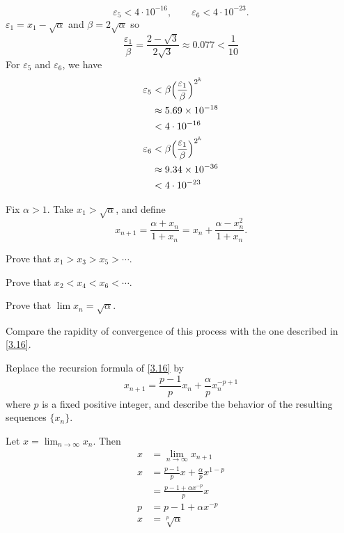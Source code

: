 \begin{exercise}
\begin{exercise}[label = (\alph*)]
    \[
    \varepsilon_5 < 4\cdot 10^{-16},\qquad\varepsilon_6 < 4\cdot 10^{-23}.
    \]
    \(\varepsilon_1 = x_1 - \sqrt{\alpha}\) and \(\beta = 2\sqrt{\alpha}\) so
    \[
    \frac{\varepsilon_1}{\beta} = \frac{2 - \sqrt{3}}{2\sqrt{3}}\approx 0.077 <
    \frac{1}{10}
    \]
    For \(\varepsilon_5\) and \(\varepsilon_6\), we have
    \begin{align*}
      \varepsilon_5 & < \beta\Bigl(\frac{\varepsilon_1}{\beta}\Bigr)^{2^k}\\
                 & \approx 5.69\times 10^{-18}\\
                 & < 4\cdot 10^{-16}\\
      \varepsilon_6 & < \beta\Bigl(\frac{\varepsilon_1}{\beta}\Bigr)^{2^k}\\
                 & \approx 9.34\times 10^{-36}\\
                 & < 4\cdot 10^{-23}
    \end{align*}
  \end{exercise}
\item
  Fix \(\alpha > 1\).
  Take \(x_1 > \sqrt{\alpha}\), and define
  \[
  x_{n + 1} = \frac{\alpha + x_n}{1 + x_n} = x_n +
  \frac{\alpha - x_n^2}{1 + x_n}.
  \]
  \begin{exercise}[label = (\alph*)]
  \item
    Prove that \(x_1 > x_3 > x_5 > \cdots\).
  \item
    Prove that \(x_2 < x_4 < x_6 < \cdots\).
  \item
    Prove that \(\lim x_n = \sqrt{\alpha}\).
  \item
    Compare the rapidity of convergence of this process with the one described
    in \cref{3.16}.
  \end{exercise}
\item
  Replace the recursion formula of \cref{3.16} by
  \[
  x_{n + 1} = \frac{p - 1}{p}x_n + \frac{\alpha}{p}x_n^{-p + 1}
  \]
  where \(p\) is a fixed positive integer, and describe the behavior of the
  resulting sequences \(\{x_n\}\).
  \par\smallskip
  Let \(x = \lim_{n\to\infty}x_n\).
  Then
  \begin{align*}
    x & = \lim_{n\to\infty}x_{n + 1}\\
    x & = \frac{p - 1}{p}x + \frac{\alpha}{p}x^{1 - p}\\
      & = \frac{p - 1 + \alpha x^{-p}}{p}x\\
    p & = p - 1 + \alpha x^{-p}\\
    x & = \sqrt[p]{\alpha}

\end{align*}
\end{exercise}
